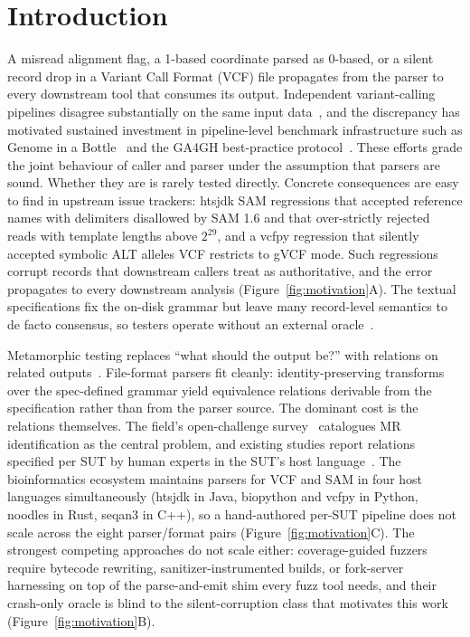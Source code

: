 \section{Introduction}
\label{sec:introduction}

A misread alignment flag, a 1-based coordinate parsed as 0-based,
or a silent record drop in a Variant Call Format (VCF) file
propagates from the parser to every downstream tool that consumes
its output. Independent variant-calling pipelines disagree substantially on
the same input data~\citep{orawe2013concordance}, and the
discrepancy has motivated sustained investment in pipeline-level
benchmark infrastructure such as Genome in a
Bottle~\citep{zook2019giab} and the GA4GH best-practice
protocol~\citep{krusche2019benchmarking}. These efforts grade the
joint behaviour of caller and parser under the assumption that
parsers are sound. Whether they are is rarely
tested directly. Concrete consequences are easy to find in
upstream issue trackers: htsjdk SAM regressions that accepted
reference names with delimiters disallowed by SAM 1.6 and that
over-strictly rejected reads with template lengths above
$2^{29}$, and a vcfpy regression that silently accepted symbolic
ALT alleles VCF restricts to gVCF mode. Such regressions
corrupt records that downstream callers treat as authoritative,
and the error propagates to every downstream analysis
(Figure~\ref{fig:motivation}A). The
textual specifications fix the on-disk grammar but leave many
record-level semantics to de facto consensus, so testers operate
without an external oracle~\citep{barr2015oracle}.



Metamorphic testing replaces ``what should the output be?'' with
relations on related
outputs~\citep{chen1998metamorphic,chen2018metamorphic}.
File-format parsers fit cleanly: identity-preserving transforms
over the spec-defined grammar yield equivalence relations
derivable from the specification rather than from the parser
source. The dominant cost is the relations themselves. The
field's open-challenge survey~\citep{chen2018metamorphic}
catalogues MR identification as the central problem, and existing
studies report relations specified per SUT by human experts in
the SUT's host language~\citep{segura2016survey}. The
bioinformatics ecosystem maintains parsers for VCF and SAM in
four host languages simultaneously (htsjdk in Java, biopython and
vcfpy in Python, noodles in Rust, seqan3 in C++), so a
hand-authored per-SUT pipeline does not scale across the eight
parser/format pairs (Figure~\ref{fig:motivation}C). The strongest
competing approaches do not scale either: coverage-guided fuzzers
require bytecode rewriting, sanitizer-instrumented builds, or
fork-server harnessing on top of the parse-and-emit shim every
fuzz tool needs, and their crash-only oracle is blind to the
silent-corruption class
that motivates this work (Figure~\ref{fig:motivation}B).


